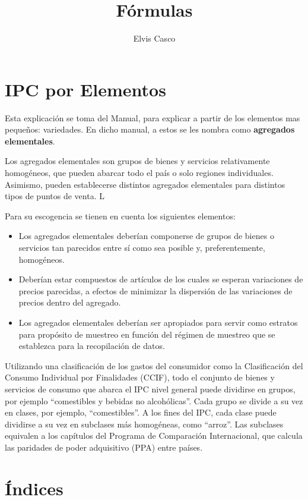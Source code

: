 \documentclass[
  landscape]{report}
\title{Fórmulas}
\author{Elvis Casco}
\date{}
\providecommand{\tightlist}{%
  \setlength{\itemsep}{0pt}\setlength{\parskip}{0pt}}\usepackage{longtable,booktabs,array}
\begin{document}
\maketitle


\chapter{IPC por Elementos}\label{ipc-por-elementos}

Esta explicación se toma del Manual, para explicar a partir de los
elementos mas pequeños: variedades. En dicho manual, a estos se les
nombra como \textbf{agregados elementales}.

Los agregados elementales son grupos de bienes y servicios relativamente
homogéneos, que pueden abarcar todo el país o solo regiones
individuales. Asimismo, pueden establecerse distintos agregados
elementales para distintos tipos de puntos de venta. L

Para su escogencia se tienen en cuenta los siguientes elementos:

\begin{itemize}
\tightlist
\item
  Los agregados elementales deberían componerse de grupos de bienes o
  servicios tan parecidos entre sí como sea posible y, preferentemente,
  homogéneos.
\item
  Deberían estar compuestos de artículos de los cuales se esperan
  variaciones de precios parecidas, a efectos de minimizar la dispersión
  de las variaciones de precios dentro del agregado.
\item
  Los agregados elementales deberían ser apropiados para servir como
  estratos para propósito de muestreo en función del régimen de muestreo
  que se establezca para la recopilación de datos.
\end{itemize}

Utilizando una clasificación de los gastos del consumidor como la
Clasificación del Consumo Individual por Finalidades (CCIF), todo el
conjunto de bienes y servicios de consumo que abarca el IPC nivel
general puede dividirse en grupos, por ejemplo ``comestibles y bebidas
no alcohólicas''. Cada grupo se divide a su vez en clases, por ejemplo,
``comestibles''. A los fines del IPC, cada clase puede dividirse a su
vez en subclases más homogéneas, como ``arroz''. Las subclases equivalen
a los capítulos del Programa de Comparación Internacional, que calcula
las paridades de poder adquisitivo (PPA) entre países.

\chapter{Índices}\label{uxedndices}
\end{document}
